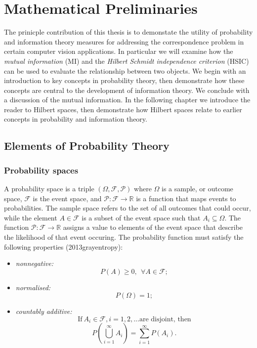\chapter{Mathematical Preliminaries}
\label{probability}


The prinicple contribution of this thesis is to demonstate the utility of probability and information theory measures for addressing the correspondence problem in certain computer vision applications. In particular we will examine how the \textit{mutual information} (MI) and the \textit{Hilbert Schmidt independence criterion} (HSIC) can be used to evaluate the relationship between two objects. We begin with an introduction to key concepts in probability theory, then demonstrate how these concepts are central to the development of information theory. We conclude with a discussion of the mutual information. In the following chapter we introduce the reader to Hilbert spaces, then demonstrate how Hilbert spaces relate to earlier concepts in probability and information theory. 

\section{Elements of Probability Theory}

\subsection{Probability spaces}

A probability space is a triple $(\Omega, \mathcal{F}, \mathcal{P})$ where $\Omega$ is a sample, or outcome space, $\mathcal{F}$ is the event space, and $\mathcal{P} : \mathcal{F} \rightarrow \mathbb{R}$ is a function that maps events to probabilities. The sample space refers to the set of all outcomes that could occur, while the element $A \in \mathcal{F}$ is a subset of the event space such that $A_i \subseteq \Omega$. The function $\mathcal{P} : \mathcal{F} \rightarrow \mathbb{R}$ assigns a value to elements of the event space that describe the likelihood of that event occuring. The probability function must satisfy the following properties (2013grayentropy):

\begin{itemize}
	\item \textit{nonnegative:} 
		\begin{equation}
			P(A) \geq 0, \:\: \forall A \in \mathcal{F};
		\end{equation}
	\item \textit{normalised:} 
		\begin{equation}
			P(\Omega) = 1;
		\end{equation}
	\item \textit{countably additive:} 
		$$\text{If} \: A_i \in \mathcal{F}, i = 1, 2, ... \text{are disjoint, then}$$
		\begin{equation}
			P(\bigcup_{i=1}^{\infty} A_i) = \sum_{i=1}^{\infty}{P(A_i)}.
		\end{equation}
\end{itemize}


